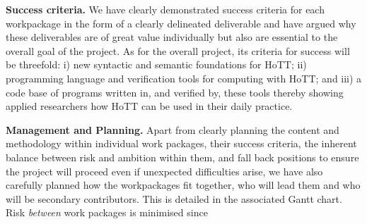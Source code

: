 \documentclass[a4paper,11pt]{article}
\begin{document}
\vspace*{0.02in}

{\bf Success criteria.} We have clearly demonstrated success criteria
for each workpackage in the form of a clearly delineated deliverable
and have argued why these deliverables are of great value individually
but also are essential to the overall goal of the project. As for the
overall project, its criteria for success will be threefold: i) new
syntactic and semantic foundations for HoTT; ii) programming language
and verification tools for computing with HoTT; and iii) a code base
of programs written in, and verified by, these tools thereby showing
applied researchers how HoTT can be used in their daily practice.


\vspace*{0.02in}

{\bf Management and Planning.} Apart from clearly planning the content
and methodology within individual work packages, their success
criteria, the inherent balance between risk and ambition within them,
and fall back positions to ensure the project will proceed even if
unexpected difficulties arise, we have also carefully planned how the
workpackages fit together, who will lead them and who will be secondary
contributors. This is detailed in the associated Gantt chart.
Risk {\em between} work packages is minimised since
\end{document}
